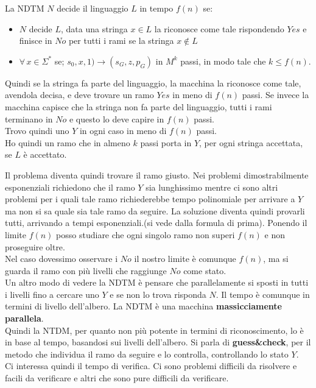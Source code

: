 La NDTM $N$ decide il linguaggio $L$ in tempo $f(n)$ se:
\begin{itemize}
    \item $N$ decide $L$, data una stringa $x \in L$ la riconosce come tale rispondendo $Yes$ e finisce in $No$ per tutti i rami se la stringa $x \notin L$
    \item $\forall\,x\in \Sigma^*$ se; $s_0,x,1)\to(s_G, z, p_G)$ in $M^k$ passi, in modo tale che $k \leq f(n)$. 
\end{itemize}
Quindi se la stringa fa parte del linguaggio, la macchina la riconosce come tale, avendola decisa, e deve trovare un ramo $Yes$ in meno di $f(n)$ passi. Se invece la macchina capisce che la stringa non fa parte del linguaggio, tutti i rami terminano in $No$ e questo lo deve capire in $f(n)$ passi.\\
Trovo quindi uno $Y$ in ogni caso in meno di $f(n)$ passi.\\ Ho quindi un ramo che in almeno $k$ passi porta in $Y$, per ogni stringa accettata, se $L$ è accettato.

Il problema diventa quindi trovare il ramo giusto. Nei problemi dimostrabilmente esponenziali richiedono che il ramo $Y$ sia lunghissimo mentre ci sono altri problemi per i quali tale ramo richiederebbe tempo polinomiale per arrivare a $Y$ ma non si sa quale sia tale ramo da seguire. La soluzione diventa quindi provarli tutti, arrivando a tempi esponenziali.(si vede dalla formula di prima). Ponendo il limite $f(n)$ posso studiare che ogni singolo ramo non superi $f(n)$ e non proseguire oltre.\\ Nel caso dovessimo osservare i $No$ il nostro limite è comunque $f(n)$, ma si guarda il ramo con più livelli che raggiunge $No$ come stato.  \\

Un altro modo di vedere la NDTM è pensare che parallelamente si sposti in tutti i livelli fino a cercare uno $Y$ e se non lo trova risponda $N$. Il tempo è comunque in termini di livello dell'albero. La NDTM è una macchina \textbf{massicciamente parallela}.\\ Quindi la NTDM, per quanto non più potente in termini di riconoscimento, lo è in base al tempo, basandosi sui livelli dell'albero. Si parla di \textbf{guess\&check}, per il metodo che individua il ramo da seguire e lo controlla, controllando lo stato $Y$.\\ Ci interessa quindi il tempo di verifica. Ci sono problemi difficili da risolvere e facili da verificare e altri che sono pure difficili da verificare.\\

